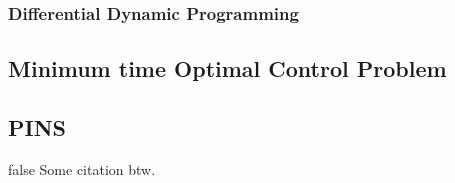 % 




\subsubsection{Differential Dynamic Programming}



\subsection{Minimum time Optimal Control Problem}


\subsection{PINS}

% 

\if false
Some citation btw.
\cite{bertolazzi2005symbolic}
\cite{bertolazzi2006symbolic}
\cite{biral2016notes}
\cite{cossalter2006motorcycle}
\cite{dal2019comparison}
\cite{guiggiani2014science}
\cite{lot2014curvilinear,pacejka2006tyre}

\cite{pacejka2006tyre}
\cite{rao2009survey}
\cite{rodrigues2014optimal}
\cite{sharp2004advances}
\cite{sharp2014method}

\fi